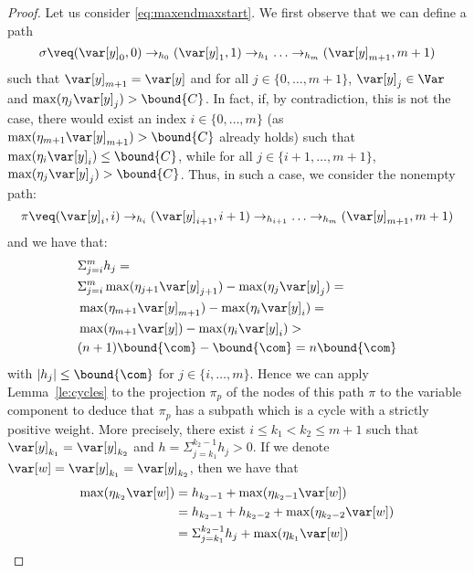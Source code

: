 \begin{proof}
  Let us consider \eqref{eq:maxendmaxstart}. We first observe that we
  can define a path
  \begin{equation}
    \label{eq:fixnr}
    \sigma \veq (\var[y]_0, 0) \to_{h_0} (\var[y]_1, 1) \to_{h_1}
    \ldots \to_{h_m} (\var[y]_{m+1}, m+1)
  \end{equation}
  such that \(\var[y]_{m+1}=\var[y]\) and for all \(j \in \{0,\ldots, m+1\}\), 
  \(\var[y]_j\in \Var\)  and
  \(\max(\eta_{j} \var[y]_{j}) > \bound{C}\).
  In fact, if, by contradiction, this is not the case, there  would exist an index \(i \in \{0,\ldots, m\}\) (as \(\max(\eta_{m+1} \var[y]_{m+1}) > \bound{C}\) already holds)
  such that \(\max(\eta_{i} \var[y]_{i}) \leq
  \bound{C}\), while for all
  \(j \in \{i+1,\ldots, m+1\}\), \(\max(\eta_{j} \var[y]_j) > \bound{C}\).
  Thus, in such a case, 
  we consider the nonempty path:
  \[\pi \veq (\var[y]_i, i) \to_{h_i} (\var[y]_{i+1}, i+1) \to_{h_{i+1}} \ldots
  \to_{h_m} (\var[y]_{m+1}, m+1)\]
  and we have that:
  \begin{align*}
    &\Sigma_{j=i}^m h_j =\\ 
    &\Sigma_{j=i}^m \max(\eta_{j+1} \var[y]_{j+1}) - \max(\eta_j \var[y]_{j}) =\\
    &\max(\eta_{m+1} \var[y]_{m+1}) - \max(\eta_i \var[y]_{i}) =\\
    &\max(\eta_{m+1} \var[y]) - \max(\eta_i \var[y]_{i})>\\
    &  (n+1) \bound{\com} - \bound{\com} = n \bound{\com}
  \end{align*}
  with \(|h_j| \leq \bound{\com}\) for \(j \in \{i,\ldots, m\}\). Hence
  we can apply Lemma~\ref{le:cycles} to the projection \(\pi_p\) of the nodes
  of this path \(\pi\) to the variable
  component 
  to deduce that \(\pi_p\) has a subpath which is a cycle with a strictly positive weight. 
  More precisely, there
  exist \(i \leq k_1 < k_2 \leq m+1\) such that
  \(\var[y]_{k_1} = \var[y]_{k_2}\) and
  \(h = \Sigma_{j=k_1}^{k_2-1} h_j > 0\). If we denote 
  \(\var[w] = \var[y]_{k_1} = \var[y]_{k_2}\), then we
  have  that   
  \begin{align*}
    \max(\eta_{k_2} \var[w]) & =  h_{k_2-1}  + \max(\eta_{k_2-1} \var[w]) \\
                             & =  h_{k_2-1} + h_{k_2-2} + \max(\eta_{k_2-2} \var[w])  \\
                             & = \Sigma_{j=k_1}^{k_2-1} h_j + \max(\eta_{k_1} \var[w])  \\

\end{align*}
\end{proof}
